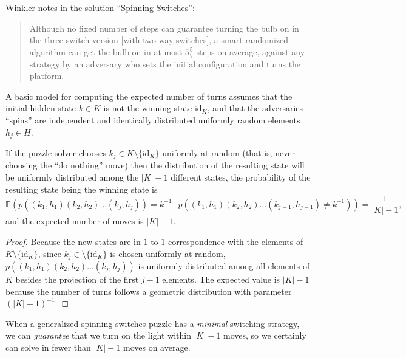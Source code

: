 Winkler \cite{Winkler2021}
notes in the solution ``Spinning Switches'':
\begin{quote}
  Although no fixed number of steps can guarantee turning the bulb on in the
  three-switch version [with two-way switches],
  a smart randomized algorithm can get the bulb on in at most $5 \frac{5}{7}$
  steps on average, against any strategy by an adversary who sets the initial
  configuration and turns the platform. \cite{Winkler2021}
\end{quote}

%

%
A basic model for computing the expected number of turns assumes that
the initial hidden state $k \in K$ is not the winning state $\mathrm{id}_K$,
and that the adversaries ``spins'' are independent and identically distributed
uniformly random elements $h_j \in H$.

\begin{proposition}
  If the puzzle-solver chooses $k_j \in K \setminus \{\mathrm{id}_K\}$ uniformly
  at random (that is, never choosing the ``do nothing'' move)
  then the distribution of the resulting state will be uniformly distributed
  among the $|K| - 1$ different states, the probability of the resulting state
  being the winning state is
  \[
    \mathbb{P}(p((k_1, h_1)(k_2, h_2)\dots(k_j, h_j))=k^{-1}\ |\ p((k_1, h_1)(k_2, h_2)\dots(k_{j-1}, h_{j-1})\neq k^{-1})) = \frac{1}{|K| - 1},
  \] and the expected number of moves is $|K| - 1$.
\label{prop:randomStrategy}
\end{proposition}
\begin{proof}
  Because the new states are in $1$-to-$1$ correspondence with the elements of
  $K \setminus \{\mathrm{id}_K\}$, since $k_j \in \setminus \{\mathrm{id}_K\}$
  is chosen uniformly at random, $p((k_1, h_1)(k_2, h_2)\dots(k_j, h_j))$
  is uniformly distributed among all elements of $K$ besides the projection of
  the first $j-1$ elements.
  The expected value is $|K| - 1$ because the number of turns follows a
  geometric distribution with parameter {$(|K| - 1)^{-1}$}.
\end{proof}

When a generalized spinning switches puzzle has a \textit{minimal} switching
strategy, we can \textit{guarantee} that we turn on the light within $|K|-1$
moves, so we certainly can solve in fewer than $|K|-1$ moves on average.

